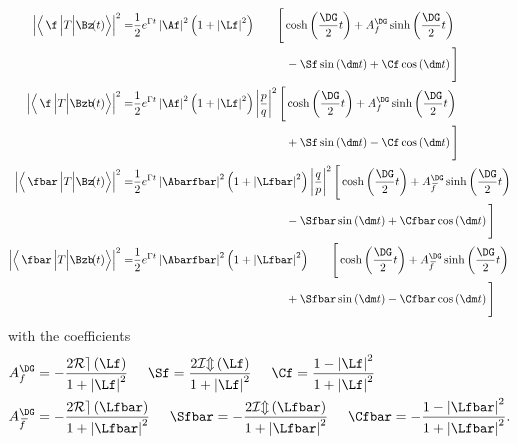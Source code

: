 \begin{align}
\left|\left<\,\f\,\Big|T\Big|\Bz\!(t)\right>\right|^2 =&
\frac{1}{2}e^{\Gamma t}\left|\Af\right|^2\left(1+\left|\Lf\right|^2\right)\hphantom{\left|\frac{p}{q}\right|^2}
\Bigg[\cosh\left(\frac{\DG}{2}t\right) + A_f^{\DG}\sinh\left(\frac{\DG}{2}t\right)\nonumber\\
&\hphantom{\frac{1}{2}e^{\Gamma t}\left|\Af\right|^2\left(1+\left|\Lf\right|^2\right)\left|\frac{p}{q}\right|^2\Bigg[}
-\Sf\sin\left(\dm t\right)+\Cf\cos\left(\dm t\right)\Bigg]\\
\left|\left<\,\f\,\Big|T\Big|\Bzb\!(t)\right>\right|^2 =&
\frac{1}{2}e^{\Gamma t}\left|\Af\right|^2\left(1+\left|\Lf\right|^2\right)\left|\frac{p}{q}\right|^2
\Bigg[\cosh\left(\frac{\DG}{2}t\right) + A_f^{\DG}\sinh\left(\frac{\DG}{2}t\right)\nonumber\\
&\hphantom{\frac{1}{2}e^{\Gamma t}\left|\Af\right|^2\left(1+\left|\Lf\right|^2\right)\left|\frac{p}{q}\right|^2\Bigg[}
+\Sf\sin\left(\dm t\right)-\Cf\cos\left(\dm t\right)\Bigg]\\
\left|\left<\,\fbar\,\Big|T\Big|\Bz\!(t)\right>\right|^2 =&
\frac{1}{2}e^{\Gamma t}\left|\Abarfbar\right|^2\left(1+\left|\Lfbar\right|^2\right)\left|\frac{q}{p}\right|^2
\Bigg[\cosh\left(\frac{\DG}{2}t\right) + A_{\kern 1.5pt\overline{\kern -1.5pt f\kern 1.5pt}}^{\DG}\sinh\left(\frac{\DG}{2}t\right)\nonumber\\
&\hphantom{\frac{1}{2}e^{\Gamma t}\left|\Af\right|^2\left(1+\left|\Lf\right|^2\right)\left|\frac{q}{p}\right|^2\Bigg[}
-\Sfbar\sin\left(\dm t\right)+\Cfbar\cos\left(\dm t\right)\Bigg]\\
\left|\left<\,\fbar\,\Big|T\Big|\Bzb\!(t)\right>\right|^2 =&
\frac{1}{2}e^{\Gamma t}\left|\Abarfbar\right|^2\left(1+\left|\Lfbar\right|^2\right)\hphantom{\left|\frac{q}{p}\right|^2}
\Bigg[\cosh\left(\frac{\DG}{2}t\right) + A_{\kern 1.5pt\overline{\kern -1.5pt f\kern 1.5pt}}^{\DG}\sinh\left(\frac{\DG}{2}t\right)\nonumber\\
&\hphantom{\frac{1}{2}e^{\Gamma t}\left|\Af\right|^2\left(1+\left|\Lf\right|^2\right)\left|\frac{q}{p}\right|^2\Bigg[}
+\Sfbar\sin\left(\dm t\right)-\Cfbar\cos\left(\dm t\right)\Bigg]
\end{align}
with the \CP coefficients
\begin{align}
A_f^{\DG}&=-\frac{2\mathcal{Re}\left(\Lf\right)}{1+\left|\Lf\right|^2}\hspace{0.5cm}
\Sf=\frac{2\mathcal{Im}\left(\Lf\right)}{1+\left|\Lf\right|^2}\hspace{0.5cm}
\Cf=\frac{1-\left|\Lf\right|^2}{1+\left|\Lf\right|^2}\\
A_{\kern 1.5pt\overline{\kern -1.5pt f\kern 1.5pt}}^{\DG}&=-\frac{2\mathcal{Re}\left(\Lfbar\right)}{1+\left|\Lfbar\right|^2}\hspace{0.5cm}
\Sfbar=-\frac{2\mathcal{Im}\left(\Lfbar\right)}{1+\left|\Lfbar\right|^2}\hspace{0.5cm}
\Cfbar=-\frac{1-\left|\Lfbar\right|^2}{1+\left|\Lfbar\right|^2}.
\end{align}
